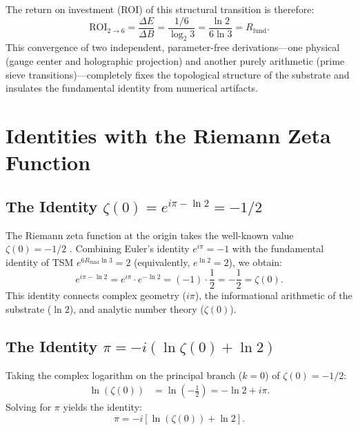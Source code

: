 \documentclass[10pt,a4paper]{article}
\newcommand{\Rfund}{R_{\text{fund}}}
\begin{document}
The return on investment (ROI) of this structural transition is therefore:
\begin{equation}
\boxed{\mathrm{ROI}_{2 \to 6} = \frac{\Delta E}{\Delta B} = \frac{1/6}{\log_2 3} = \frac{\ln 2}{6\ln 3} = \Rfund}.
\label{eq:eratosthenes}
\end{equation}
This convergence of two independent, parameter-free derivations---one physical (gauge center and holographic projection) and another purely arithmetic (prime sieve transitions)---completely fixes the topological structure of the substrate and insulates the fundamental identity from numerical artifacts.

\section{Identities with the Riemann Zeta Function}
\label{sec:zeta}

\subsection[The Identity zeta(0) = exp(i pi - ln 2) = -1/2]{The Identity \(\zeta(0) = e^{i\pi - \ln 2} = -1/2\)}

The Riemann zeta function at the origin takes the well-known value \(\zeta(0) = -1/2\) \cite{Edwards1974}.
Combining Euler's identity \(e^{i\pi} = -1\) with the fundamental identity of TSM \(e^{6\Rfund\ln 3} = 2\) (equivalently, \(e^{\ln 2} = 2\)), we obtain:
\begin{equation}
e^{i\pi - \ln 2} = e^{i\pi} \cdot e^{-\ln 2} = (-1) \cdot \frac{1}{2} = -\frac{1}{2} = \zeta(0).
\label{eq:zeta0}
\end{equation}
This identity connects complex geometry (\(i\pi\)), the informational arithmetic of the substrate (\(\ln 2\)), and analytic number theory (\(\zeta(0)\)).

\subsection[The Identity pi = -i(ln zeta(0) + ln 2)]{The Identity \(\pi = -i(\ln\zeta(0) + \ln 2)\)}

Taking the complex logarithm on the principal branch (\(k=0\)) of \(\zeta(0) = -1/2\):
\begin{align}
\ln(\zeta(0)) & = \ln\left(-\frac{1}{2}\right) = -\ln 2 + i\pi.
\label{eq:logzeta}
\end{align}
Solving for \(\pi\) yields the identity:
\begin{equation}
\boxed{\pi = -i\left[\ln(\zeta(0)) + \ln 2\right]}.
\label{eq:pi}
\end{equation}
\end{document}

